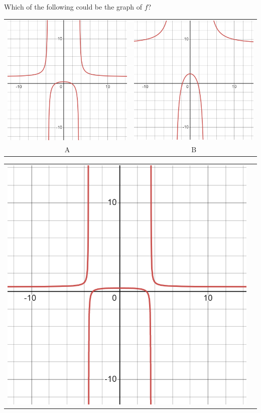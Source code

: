 \documentclass{ximera}
\begin{document}
\begin{exercise}
	Which of the following could be the graph of $f$?
	\begin{multipleChoice}
	\end{multipleChoice}

	\begin{center}
		\begin{tabular}{cc}
			\includegraphics[width=0.49\linewidth]{RF17-1.png} &
			\includegraphics[width=0.49\linewidth]{RF17-2.png} \\
 			A & B\\
		\end{tabular}
	\end{center}
	\begin{center}
		\begin{tabular}{cc}
			\includegraphics[width=0.49\linewidth]{RF17-3.png} &

\end{tabular}
\end{center}
\end{exercise}
\end{document}
